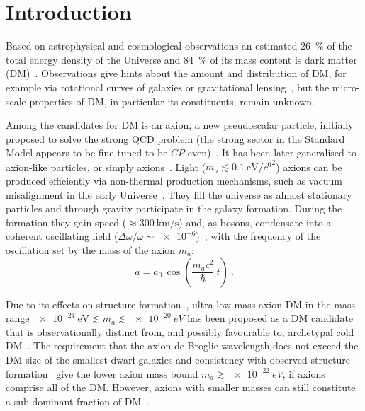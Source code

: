 \chapter{Introduction}
\label{ch:axions-intro}

Based on astrophysical and cosmological observations an estimated \SI{26}{\percent} of the total energy density of the Universe and \SI{84}{\percent} of its mass content is dark matter (DM)~\cite{Planck2015}.
Observations give hints about the amount and distribution of DM, for example via rotational curves of galaxies or gravitational lensing~\cite{ApJ1990}, but the micro-scale properties of DM, in particular its constituents, remain unknown.

Among the candidates for DM is an axion, a new pseudoscalar particle, initially proposed to solve the strong QCD problem (the strong sector in the Standard Model appears to be fine-tuned to be $CP$-even)~\cite{PhysRevLett.38.1440,PQ1977B,Weinberg1978,Wilczek1978,Kim1979,Zakharov1980,Zhitnitsky1980B,Srednicki1981}. 
It has been later generalised to axion-like particles, or simply axions~\cite{Witten1984,Conlon2006,Witten2006,Arvanitaki2010,Arias2012,Marsh2015Review}.
Light ($m_a \lesssim \SI[per-mode=symbol]{0.1}{\electronvolt\per\clight\squared}$) axions can be produced efficiently via non-thermal production mechanisms, such as vacuum misalignment in the early Universe~\cite{Preskill1983cosmo,Sikivie1983cosmo,Dine1983cosmo}.
They fill the universe as almost stationary particles and through gravity participate in the galaxy formation. During the formation they gain speed ($\approx \SI[per-mode=symbol]{300}{\kilo\metre\per\second}$) and, as bosons, condensate into a coherent oscillating field ($\Delta\omega / \omega \sim \num{e-6}$)~\cite{Marsh2015Review}, with the frequency of the oscillation set by the mass of the axion $m_a$:
\begin{equation}
  a = a_0 \, \cos\left(\frac{ m_a c^2 }{\hbar} \ t\right) \ .
\end{equation}

Due to its effects on structure formation~\cite{Khlopov1985}, ultra-low-mass axion DM in the mass range $\SI{e-24}{\electronvolt} \lesssim m_a \lesssim \SI{e-20}{eV}$ has been proposed as a DM candidate that is observationally distinct from, and possibly favourable to, archetypal cold DM~\cite{Hu2000,Marsh2014,Schive2014,Marsh2015Review,Hui2017}.
The requirement that the axion de Broglie wavelength does not exceed the DM size of the smallest dwarf galaxies and consistency with observed structure formation~\cite{Marsh2015B,Schive2015,Marsh2017} give the lower axion mass bound $m_a \gtrsim \SI{e-22}{eV}$, if axions comprise all of the DM\@. However, axions with smaller masses can still constitute a sub-dominant fraction of DM~\cite{Hlozek15}.

